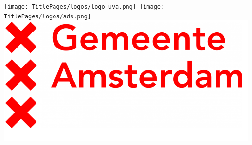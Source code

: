 \begin{titlepage}
\bigskip

\begin{center}
\mbox{\texttt{[image: TitlePages/logos/logo-uva.png]} 
\texttt{[image: TitlePages/logos/ads.png]}
\includegraphics[width=.2\paperwidth]{TitlePages/logos/Selection_272.png}
}
\end{center}
\end{titlepage}

%
%
%
